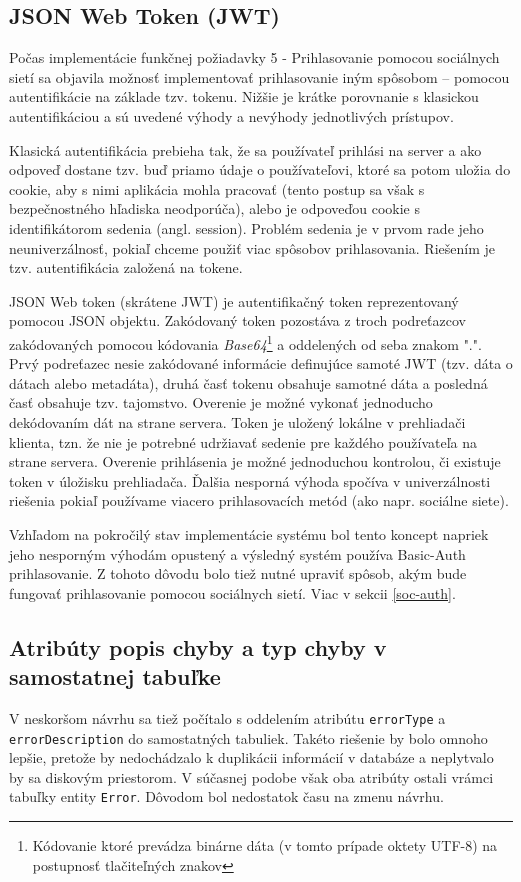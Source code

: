 \documentclass[12pt,oneside]{fithesis2}
\begin{document}
	\subsection{JSON Web Token (JWT)} \label{jwt}
	\par Počas implementácie funkčnej požiadavky 5 - Prihlasovanie pomocou sociálnych sietí sa objavila možnosť implementovať prihlasovanie iným spôsobom -- pomocou autentifikácie na základe tzv. tokenu. Nižšie je krátke porovnanie s klasickou autentifikáciou a sú uvedené výhody a nevýhody jednotlivých prístupov.
	\par Klasická autentifikácia prebieha tak, že sa používateľ prihlási na server a ako odpoveď dostane tzv. buď priamo údaje o používateľovi, ktoré sa potom uložia do cookie, aby s nimi aplikácia mohla pracovať (tento postup sa však s bezpečnostného hľadiska neodporúča), alebo je odpoveďou cookie s identifikátorom sedenia (angl. session). Problém sedenia je v prvom rade jeho neuniverzálnosť, pokiaľ chceme použiť viac spôsobov prihlasovania. Riešením je tzv. autentifikácia založená na tokene\cite{yt14}.
	\par JSON Web token (skrátene JWT) je autentifikačný token reprezentovaný pomocou JSON objektu. Zakódovaný token pozostáva z troch podreťazcov zakódovaných pomocou kódovania \textit{Base64}\footnote{Kódovanie ktoré prevádza binárne dáta (v tomto prípade oktety UTF-8) na postupnosť tlačiteľných znakov} a oddelených od seba znakom ".". Prvý podreťazec nesie zakódované informácie definujúce samoté JWT (tzv. dáta o dátach alebo metadáta), druhá časť tokenu obsahuje samotné dáta a posledná časť obsahuje tzv. tajomstvo. Overenie je možné vykonať jednoducho dekódovaním dát na strane servera. Token je uložený lokálne v prehliadači klienta, tzn. že nie je potrebné udržiavať sedenie pre každého používateľa na strane servera. Overenie prihlásenia je možné jednoduchou kontrolou, či existuje token v úložisku prehliadača\cite{jwtrfc}. Ďalšia nesporná výhoda spočíva v univerzálnosti riešenia pokiaľ používame viacero prihlasovacích metód (ako napr. sociálne siete).
	\par Vzhľadom na pokročilý stav implementácie systému bol tento koncept napriek jeho nesporným výhodám opustený a výsledný systém používa Basic-Auth prihlasovanie. Z tohoto dôvodu bolo tiež nutné upraviť spôsob, akým bude fungovať prihlasovanie pomocou sociálnych sietí. Viac v sekcii \ref{soc-auth}.
	
	 \subsection{Atribúty popis chyby a typ chyby v samostatnej tabuľke}
	 \par V neskoršom návrhu sa tiež počítalo s oddelením atribútu \texttt{errorType} a \texttt{errorDescription} do samostatných tabuliek. Takéto riešenie by bolo omnoho lepšie, pretože by nedochádzalo k duplikácii informácií v databáze a neplytvalo by sa diskovým priestorom. V súčasnej podobe však oba atribúty ostali vrámci tabuľky entity \texttt{Error}. Dôvodom bol nedostatok času na zmenu návrhu.
	 
\end{document}
